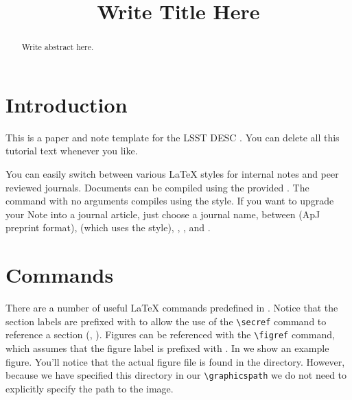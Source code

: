 \documentclass[\docopts]{\docclass}
\begin{document}
\title{Write Title Here}

\maketitlepre

\begin{abstract}

  Write abstract here.

\end{abstract}


\maketitlepost


\section{Introduction}
\label{sec:intro}

This is a paper and note template for the LSST DESC \citep{Overview,ScienceBook,WhitePaper}.
You can delete all this tutorial text whenever you like.

You can easily switch between various \LaTeX\xspace styles for internal notes and peer reviewed journals.
Documents can be compiled using the provided .
The command  with no arguments compiles  using the   style.
If you want to upgrade your Note into a journal article, just choose a journal name, between  (ApJ preprint format),  (which uses the  style), , , and .



\section{Commands}
\label{sec:commands}

There are a number of useful \LaTeX\xspace commands predefined in .
Notice that the section labels are prefixed with  to allow the use of the \verb=\secref= command to reference a section (\ie, ).
Figures can be referenced with the \verb=\figref= command, which assumes that the figure label is prefixed with .
In  we show an example figure.
You'll notice that the actual figure file is found in the  directory.
However, because we have specified this directory in our \verb=\graphicspath= we do not need to explicitly specify the path to the image.
\end{document}
